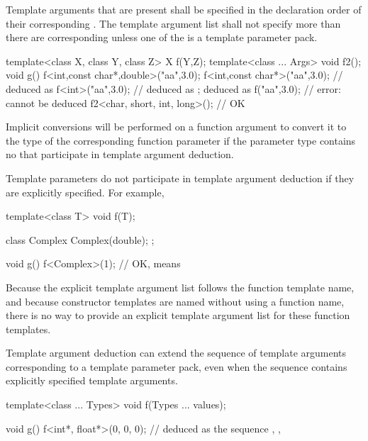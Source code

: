 \pnum
Template arguments that are present shall be specified in the declaration
order of their corresponding
.
The template argument list shall not specify more
than there are corresponding
unless one of the  is a template
parameter pack.
\begin{example}
\begin{codeblock}
template<class X, class Y, class Z> X f(Y,Z);
template<class ... Args> void f2();
void g() {
  f<int,const char*,double>("aa",3.0);
  f<int,const char*>("aa",3.0); //  deduced as 
  f<int>("aa",3.0);             //  deduced as ;  deduced as 
  f("aa",3.0);                  // error:  cannot be deduced
  f2<char, short, int, long>(); // OK
}
\end{codeblock}
\end{example}

\pnum
Implicit conversions will be performed on a function argument
to convert it to the type of the corresponding function parameter if
the parameter type contains no
that participate in template argument deduction.
\begin{note}
Template parameters do not participate in template argument deduction if
they are explicitly specified.
For example,

\begin{codeblock}
template<class T> void f(T);

class Complex {
  Complex(double);
};

void g() {
  f<Complex>(1);    // OK, means 
}
\end{codeblock}
\end{note}

\pnum
\begin{note}
Because the explicit template argument list follows the function
template name, and because
constructor templates are named without using a
function name, there is no way to provide an explicit
template argument list for these function templates.
\end{note}

\pnum
Template argument deduction can extend the sequence of template
arguments corresponding to a template parameter pack, even when the
sequence contains explicitly specified template arguments.
\begin{example}
\begin{codeblock}
template<class ... Types> void f(Types ... values);

void g() {
  f<int*, float*>(0, 0, 0);     //  deduced as the sequence , , 
}
\end{codeblock}
\end{example}


